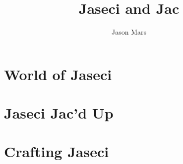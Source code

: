 \documentclass{book}
\title{Jaseci and Jac}
\author{Jason Mars}
\begin{document}








\part{World of Jaseci}








\part{Jaseci Jac'd Up}


\part{Crafting Jaseci}






\appendix







\end{document}
